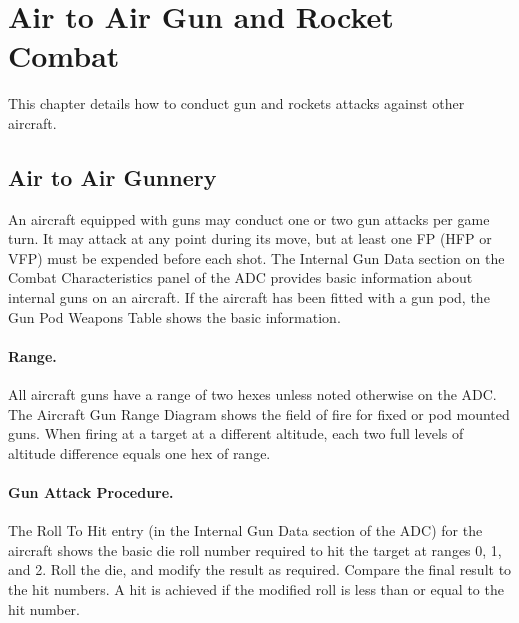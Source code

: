 \section{Air to Air Gun and Rocket Combat}

This chapter details how to conduct gun and rockets attacks against other aircraft.

\subsection{Air to Air Gunnery}

An aircraft equipped with guns may conduct one or two gun attacks per game turn. It may attack at any point during its move, but at least one FP (HFP or VFP) must be expended before each shot. The Internal Gun Data section on the Combat Characteristics panel of the ADC provides basic information about internal guns on an aircraft. If the aircraft has been fitted with a gun pod, the Gun Pod Weapons Table shows the basic information.

\paragraph{Range.} All aircraft guns have a range of two hexes unless noted otherwise on the ADC. The Aircraft Gun Range Diagram shows the field of fire for fixed or pod mounted guns. When firing at a target at a different altitude, each two full levels of altitude difference equals one hex of range.


\paragraph{Gun Attack Procedure.} The Roll To Hit entry (in the Internal Gun Data section of the ADC) for the aircraft shows the basic die roll number required to hit the target at ranges 0, 1, and 2. Roll the die, and modify the result as required. Compare the final result to the hit numbers. A hit is achieved if the modified roll is less than or equal to the hit number.

